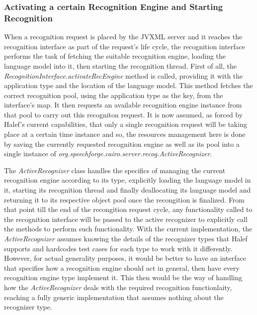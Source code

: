 \subsubsection{Activating a certain Recognition Engine and Starting Recognition}
When a recognition request is placed by the JVXML server and it reaches the recognition interface as part of the request's life cycle, the recognition interface performs the task of fetching the suitable recognition engine, loading the language model into it, then starting the recognition thread.
First of all, the \textit{RecognitionInterface.activateRecEngine} method is called, providing it with the application type and the location of the language model.
This method fetches the correct recognition pool, using the application type as the key, from the interface's map.
It then requests an available recognition engine instance from that pool to carry out this recogniton request.
It is now assumed, as forced by Halef's current capabilities, that only a single recognition request will be taking place at a certain time instance and so, the resources management here is done by saving the currently requested recognition engine as well as its pool into a single instance of \textit{org.speechforge.cairo.server.recog.ActiveRecognizer}.

The \textit{ActiveRecognizer} class handles the specifics of managing the current recognition engine according to its type, explicitly loading the language model in it, starting its recognition thread and finally deallocating its language model and returning it to its respective object pool once the recongition is finalized.
From that point till the end of the recongition request cycle, any functionality called to the recognition interface will be passed to the active recognizer to explicitly call the methods to perform such functionality.
With the current implementation, the \textit{ActiveRecognizer} assumes knowing the details of the recognizer types that Halef supports and hardcodes test cases for each type to work with it differently.
However, for actual generality purposes, it would be better to have an interface that specifies how a recognition engine should act in general, then have every recognition engine type implement it.
This then would be the way of handling how the \textit{ActiveRecognizer} deals with the required recognition functionlaity, reaching a fully generic implementation that assumes nothing about the recognizer type.



